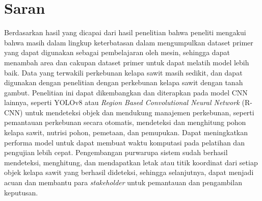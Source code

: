 \section{Saran}
\hspace{1,2cm}
Berdasarkan hasil yang dicapai dari hasil penelitian bahwa peneliti mengakui bahwa masih dalam lingkup keterbatasan dalam mengumpulkan dataset primer yang dapat digunakan sebagai pembelajaran oleh mesin, sehingga dapat menambah area dan cakupan dataset primer untuk dapat melatih model lebih baik. Data yang terwakili perkebunan kelapa sawit masih sedikit, dan dapat digunakan dengan penelitian dengan perkebunan kelapa sawit dengan tanah gambut. Penelitian ini dapat dikembangkan dan diterapkan pada model CNN lainnya, seperti YOLOv8 atau \textit{Region Based Convolutional Neural Network} (R-CNN) untuk mendeteksi objek dan mendukung manajemen perkebunan, seperti pemantauan perkebunan secara otomatis, mendeteksi dan menghitung pohon kelapa sawit, nutrisi pohon, pemetaan, dan pemupukan. Dapat meningkatkan performa model untuk dapat membuat waktu komputasi pada pelatihan dan pengujian lebih cepat. Pengembangan purwarupa sistem sudah berhasil mendeteksi, menghitung, dan mendapatkan letak atau titik koordinat dari setiap objek kelapa sawit yang berhasil dideteksi, sehingga selanjutnya, dapat menjadi acuan dan membantu para \textit{stakeholder} untuk pemantauan dan pengambilan keputusan. 